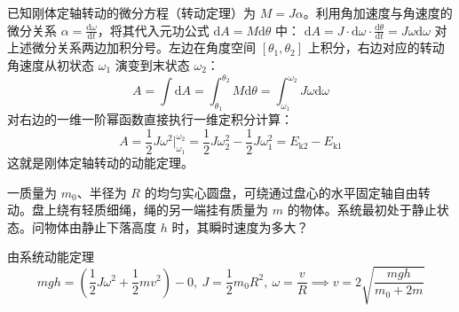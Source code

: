 \begin{theorem}[刚体定轴转动的动能定理]
已知刚体定轴转动的微分方程（转动定理）为 $M = J\alpha$。利用角加速度与角速度的微分关系 $\alpha = \frac{\mathrm{d}\omega}{\mathrm{d}t}$，将其代入元功公式 $\mathrm{d}A = M\mathrm{d}\theta$ 中： \(\mathrm{d}A = J \cdot \mathrm{d}\omega \cdot \frac{\mathrm{d}\theta}{\mathrm{d}t} = J\omega \mathrm{d}\omega\) 对上述微分关系两边加积分号。左边在角度空间 $[\theta_1, \theta_2]$ 上积分，右边对应的转动角速度从初状态 $\omega_1$ 演变到末状态 $\omega_2$：$$A = \int \mathrm{d}A = \int_{\theta_1}^{\theta_2} M\mathrm{d}\theta = \int_{\omega_1}^{\omega_2} J\omega \mathrm{d}\omega$$对右边的一维一阶幂函数直接执行一维定积分计算：$$A = \frac{1}{2}J\omega^2 \Big|_{\omega_1}^{\omega_2} = \frac{1}{2}J\omega_2^2 - \frac{1}{2}J\omega_1^2 = E_{\text{k}2} - E_{\text{k}1}$$这就是刚体定轴转动的动能定理。
\end{theorem}

\begin{exercise}
一质量为 $m_0$、半径为 $R$ 的均匀实心圆盘，可绕通过盘心的水平固定轴自由转动。盘上绕有轻质细绳，绳的另一端挂有质量为 $m$ 的物体。系统最初处于静止状态。问物体由静止下落高度 $h$ 时，其瞬时速度为多大？
\end{exercise}
\begin{solution}
由系统动能定理$$mgh = \left( \frac{1}{2}J\omega^2 + \frac{1}{2}mv^2 \right) - 0 ,~J = \frac{1}{2}m_0R^2,~ \omega = \frac{v}{R}\implies v = 2\sqrt{\frac{mgh}{m_0 + 2m}}$$
\end{solution}

